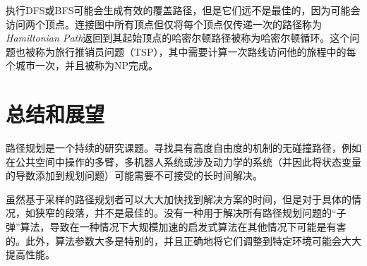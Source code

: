 
执行DFS或BFS可能会生成有效的覆盖路径，但是它们远不是最佳的，因为可能会访问两个顶点。连接图中所有顶点但仅将每个顶点仅传递一次的路径称为\emph{Hamiltonian Path}返回到其起始顶点的哈密尔顿路径被称为哈密尔顿循环。这个问题也被称为旅行推销员问题（TSP），其中需要计算一次路线访问他的旅程中的每个城市一次，并且被称为NP完成。

 
\section{总结和展望}
路径规划是一个持续的研究课题。寻找具有高度自由度的机制的无碰撞路径，例如在公共空间中操作的多臂，多机器人系统或涉及动力学的系统（并因此将状态变量的导数添加到规划问题）可能需要不可接受的长时间解决。


虽然基于采样的路径规划者可以大大加快找到解决方案的时间，但是对于具体的情况，如狭窄的段落，并不是最佳的。没有一种用于解决所有路径规划问题的“子弹”算法，导致在一种情况下大规模加速的启发式算法在其他情况下可能是有害的。此外，算法参数大多是特别的，并且正确地将它们调整到特定环境可能会大大提高性能。


